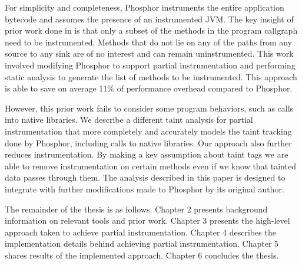 For simplicity and completeness, Phosphor instruments the entire application bytecode and assumes the presence of an instrumented JVM. The key insight of prior work done in \cite{manoj_project} is that only a subset of the methods in the program callgraph need to be instrumented. Methods that do not lie on any of the paths from any source to any sink are of no interest and can remain uninstrumented. This work involved modifying Phosphor to support partial instrumentation and performing static analysis to generate the list of methods to be instrumented. This approach is able to save on average 11\% of performance overhead compared to Phosphor. 

However, this prior work fails to consider some program behaviors, such as calls into native libraries. We describe a different taint analysis for partial instrumentation that more completely and accurately models the taint tracking done by Phosphor, including calls to native libraries. Our approach also further reduces instrumentation. By making a key assumption about taint tags we are able to remove instrumentation on certain methods even if we know that tainted data passes through them. The analysis described in this paper is designed to integrate with further modifications made to Phosphor by its original author.

The remainder of the thesis is as follows. Chapter 2 presents background information on relevant tools and prior work. Chapter 3 presents the high-level approach taken to achieve partial instrumentation. Chapter 4 describes the implementation details behind achieving partial instrumentation. Chapter 5 shares results of the implemented approach. Chapter 6 concludes the thesis.
